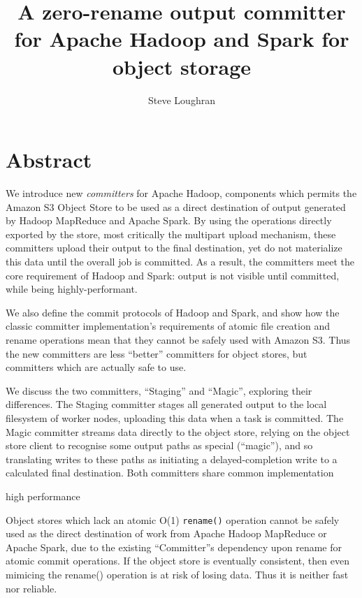 \documentclass[9pt,technote]{IEEEtran}
\begin{document}
\parindent 0pt
\setlength{\parskip}{3ex}



\title{A zero-rename output committer for Apache Hadoop and Spark for object storage}
\author{Steve Loughran}
\maketitle


\section{Abstract}

We introduce new \emph{committers} for Apache Hadoop, components which permits
the Amazon S3 Object Store to be used as a direct destination of output generated
by Hadoop MapReduce and Apache Spark. By using the operations directly exported by
the store, most critically the multipart upload mechanism, these committers upload
their output to the final destination, yet do not materialize this data until the
overall job is committed. As a result, the committers meet the core requirement of Hadoop and Spark: output is not visible until committed, while being highly-performant. 

We also define the commit protocols of Hadoop and Spark, and show how the classic committer implementation's requirements of atomic file creation and rename operations mean that they cannot be safely used with Amazon S3. Thus the new committers are less ``better'' committers for object stores, but committers which
are actually safe to use.

We discuss the two committers, ``Staging'' and ``Magic'', exploring their differences. The Staging committer stages all generated output to the local filesystem of  worker nodes, uploading this data when a task is committed. The Magic committer streams data directly to the object store, relying on the object store client to recognise some output paths as special (``magic''), and so translating writes to these paths as initiating a delayed-completion write to a calculated final destination. Both committers share common implementation 


high performance

Object stores which lack an atomic O(1) \texttt{rename()} operation cannot be safely used as the direct destination of work from Apache Hadoop MapReduce or Apache Spark, due to the existing ``Committer''s dependency upon rename for atomic commit operations. If the object store is eventually consistent, then even mimicing the rename() operation is at risk of losing data. Thus it is neither fast nor reliable.
\end{document}
